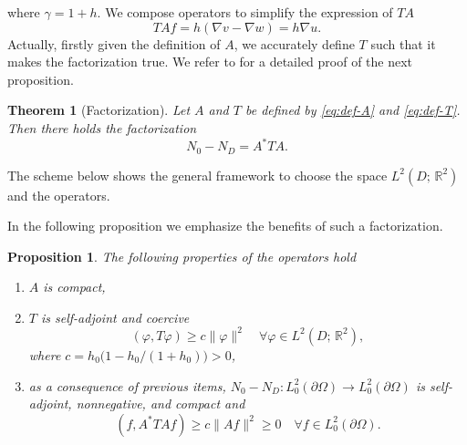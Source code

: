 \documentclass[10pt, a4paper, twoside, openright]{book}
\theoremstyle{definition}
\theoremstyle{plain}
\newtheorem{theorem}[subsection]{Theorem}
\theoremstyle{plain}
\theoremstyle{plain}
\newtheorem{proposition}[subsection]{Proposition}
\theoremstyle{plain}
\theoremstyle{plain}
\theoremstyle{plain}
\theoremstyle{plain}
\theoremstyle{plain}
\let\phi\varphi
\begin{document}
where $\gamma = 1 + h$.
We compose operators to simplify the expression of $TA$
\begin{equation}
 TAf = h (\nabla v - \nabla w) = h \nabla u.
\end{equation}
Actually, firstly given the definition of $A$, we accurately define $T$ such that it makes the factorization true.
We refer to \cite{kirsch:book} for a detailed proof of the next proposition.
\begin{theorem}[Factorization]
 Let $A$ and $T$ be defined by \eqref{eq:def-A} and \eqref{eq:def-T}. Then there holds the factorization
\begin{equation}
 {N_0} - {N_D} = A^*TA.
\end{equation}
\end{theorem}
The scheme below shows the general framework to choose the space $L^2(D;\,\mathbb{R}^2)$ and the operators.
\begin{center}
\end{center}
In the following proposition we emphasize the benefits of such a factorization.
\begin{proposition}
The following properties of the operators hold
 \begin{enumerate}
  \item $A$ is compact,
  \item $T$ is self-adjoint and coercive
  \begin{equation}
   (\phi,T\phi)\geq c\|\phi\|^2\quad \forall \phi \in L^2(D;\,\mathbb{R}^2),
  \end{equation}
  where $c = h_0\Big(1-h_0/(1+h_0)\Big)>0$,
  \item as a consequence of previous items, ${N_0} - {N_D}: L^2_0(\partial \Omega) \to L^2_0(\partial \Omega)$ is self-adjoint, nonnegative, and compact and
  \begin{equation}
   (f,A^*TAf)\geq c\|Af\|^2\geq 0\quad \forall f \in L^2_0(\partial \Omega).
  \end{equation}  
 \end{enumerate}
\end{proposition}
\end{document}
